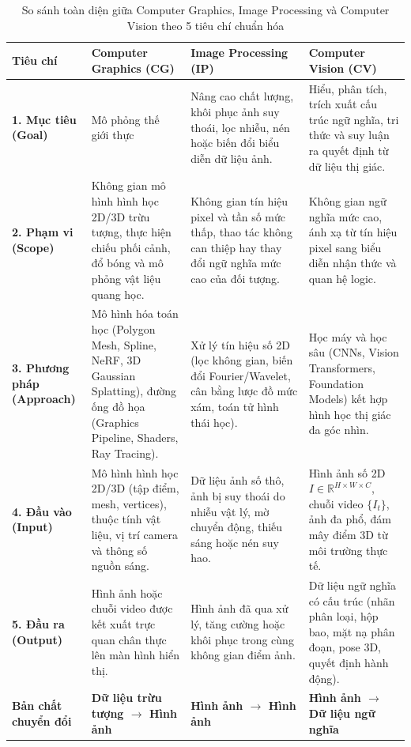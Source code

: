 \begin{table}[H]
\centering
\small
\caption{So sánh toàn diện giữa Computer Graphics, Image Processing và Computer Vision theo 5 tiêu chí chuẩn hóa}
\label{tab:comparison_cg_ip_cv}
\renewcommand{\arraystretch}{1.3}
\begin{tabularx}{\textwidth}{|p{2.8cm}|X|X|X|}
\hline
\textbf{Tiêu chí} & \textbf{Computer Graphics (CG)} & \textbf{Image Processing (IP)} & \textbf{Computer Vision (CV)} \\
\hline
\textbf{1. Mục tiêu (Goal)} & Mô phỏng thế giới thực & Nâng cao chất lượng, khôi phục ảnh suy thoái, lọc nhiễu, nén hoặc biến đổi biểu diễn dữ liệu ảnh. & Hiểu, phân tích, trích xuất cấu trúc ngữ nghĩa, tri thức và suy luận ra quyết định từ dữ liệu thị giác. \\
\hline
\textbf{2. Phạm vi (Scope)} & Không gian mô hình hình học 2D/3D trừu tượng, thực hiện chiếu phối cảnh, đổ bóng và mô phỏng vật liệu quang học. & Không gian tín hiệu pixel và tần số mức thấp, thao tác không can thiệp hay thay đổi ngữ nghĩa mức cao của đối tượng. & Không gian ngữ nghĩa mức cao, ánh xạ từ tín hiệu pixel sang biểu diễn nhận thức và quan hệ logic. \\
\hline
\textbf{3. Phương pháp (Approach)} & Mô hình hóa toán học (Polygon Mesh, Spline, NeRF, 3D Gaussian Splatting), đường ống đồ họa (Graphics Pipeline, Shaders, Ray Tracing). & Xử lý tín hiệu số 2D (lọc không gian, biến đổi Fourier/Wavelet, cân bằng lược đồ mức xám, toán tử hình thái học). & Học máy và học sâu (CNNs, Vision Transformers, Foundation Models) kết hợp hình học thị giác đa góc nhìn. \\
\hline
\textbf{4. Đầu vào (Input)} & Mô hình hình học 2D/3D (tập điểm, mesh, vertices), thuộc tính vật liệu, vị trí camera và thông số nguồn sáng. & Dữ liệu ảnh số thô, ảnh bị suy thoái do nhiễu vật lý, mờ chuyển động, thiếu sáng hoặc nén suy hao. & Hình ảnh số 2D $I \in \mathbb{R}^{H \times W \times C}$, chuỗi video $\{I_t\}$, ảnh đa phổ, đám mây điểm 3D từ môi trường thực tế. \\
\hline
\textbf{5. Đầu ra (Output)} & Hình ảnh hoặc chuỗi video được kết xuất trực quan chân thực lên màn hình hiển thị. & Hình ảnh đã qua xử lý, tăng cường hoặc khôi phục trong cùng không gian điểm ảnh. & Dữ liệu ngữ nghĩa có cấu trúc (nhãn phân loại, hộp bao, mặt nạ phân đoạn, pose 3D, quyết định hành động). \\
\hline
\textbf{Bản chất chuyển đổi} & \textbf{Dữ liệu trừu tượng $\rightarrow$ Hình ảnh} & \textbf{Hình ảnh $\rightarrow$ Hình ảnh} & \textbf{Hình ảnh $\rightarrow$ Dữ liệu ngữ nghĩa} \\
\hline
\end{tabularx}
\end{table}

